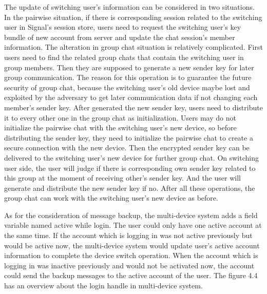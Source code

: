 \begin{enumerate}[label=(\roman*)]
The update of switching user's information can be considered in two situations. In the pairwise situation, if there is corresponding session related to the switching user in Signal's session store, users need to request the switching user's key bundle of new account from server and update the chat session's member information. The alteration in group chat situation is relatively complicated. First users need to find the related group chats that contain the switching user in group members. Then they are supposed to generate a new sender key for later group communication. The reason for this operation is to guarantee the future security of group chat, because the switching user's old device maybe lost and exploited by the adversary to get later communication data if not changing each member's sender key. After generated the new sender key, users need to distribute it to every other one in the group chat as initialization. Users may do not initialize the pairwise chat with the switching user's new device, so before distributing the sender key, they need to initialize the pairwise chat to create a secure connection with the new device. Then the encrypted sender key can be delivered to the switching user's new device for further group chat. On switching user side, the user will judge if there is corresponding own sender key related to this group at the moment of receiving other's sender key. And the user will generate and distribute the new sender key if no. After all these operations, the group chat can work with the switching user's new device as before.

As for the consideration of message backup, the multi-device system adds a field variable named active while login. The user could only have one active account at the same time. If the account which is logging in was not active previously but would be active now, the multi-device system would update user's active account information to complete the device switch operation. When the account which is logging in was inactive previously and would not be activated now, the account could send the backup messages to the active account of the user. The figure 4.4 has an overview about the login handle in multi-device system.


\end{enumerate}
